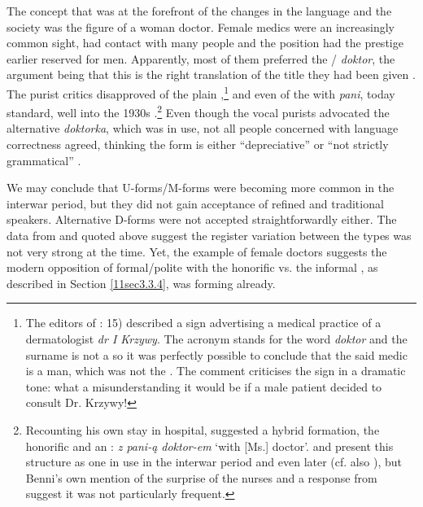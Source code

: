 \documentclass[output=paper,colorlinks,citecolor=brown]{langscibook}
\begin{document}
\largerpage
The concept that was at the forefront of the changes in the language and the society was the figure of a woman doctor. Female medics were an increasingly common sight, had contact with many people and the position had the prestige earlier reserved for men. Apparently, most of them preferred the / \emph{doktor}, the argument being that this is the right translation of the  title they had been given \citep[118]{poradnikjezykowy1911}. The purist critics disapproved of the plain ,\footnote{The editors of \citealt{poradnikjezykowy1925-zagadnienia}: 15) described a sign advertising a medical practice of a dermatologist \emph{dr I Krzywy}. The acronym stands for the word \emph{doktor} and the surname is not a  so it was perfectly possible to conclude that the said medic is a man, which was not the . The comment criticises the sign in a dramatic tone: what a misunderstanding it would be if a male patient decided to consult Dr. Krzywy!\label{11ftn32}} and even of the  with \emph{pani}, today standard, well into the 1930s \citep[159]{jezykpolski1931-208}.\footnote{Recounting his own stay in hospital, \citet[184]{benni1933} suggested a hybrid formation, the  honorific and an : \emph{z pani-ą doktor-em} `with [Ms.] doctor'. \citet[37]{klemensiewicz1957} and \citet[65]{nitsch1951} present this structure as one in use in the interwar period and even later (cf. also \citealt[374]{kupiszewski1967}), but Benni's own mention	of the surprise of the nurses and a response from \citet{obrebska1933} suggest it was not particularly frequent.} Even though the vocal purists advocated the  alternative \emph{doktorka}, which was in use, not all people concerned with language correctness agreed, thinking the form is either ``depreciative'' \citep[55]{poradnikjezykowy1906} or ``not strictly grammatical'' \citep[104]{poradnikjezykowy1925-odpowiedzi}.

We may conclude that U-forms/M-forms were becoming more common in the interwar period, but they did not gain acceptance of refined and traditional speakers. Alternative D-forms were not accepted straightforwardly either. The data from \citet{klemensiewicz1957} and \citet{wozniak2014} quoted above suggest the register variation between the types was not very strong at the time. Yet, the example of female doctors suggests the modern opposition of formal/polite  with the honorific vs. the informal , as described in Section \ref{11sec3.3.4}, was forming already.
\end{document}
